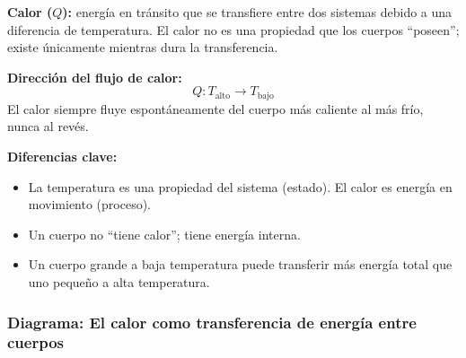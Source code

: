 \begin{seccion}
\begin{definicion}
\textbf{Calor ($Q$):} energía en tránsito que se transfiere entre dos sistemas debido a una diferencia de temperatura. El calor no es una propiedad que los cuerpos ``poseen''; existe únicamente mientras dura la transferencia.
\end{definicion}

\begin{ecuacion}
\textbf{Dirección del flujo de calor:}
$$Q: T_{\text{alto}} \longrightarrow T_{\text{bajo}}$$
El calor siempre fluye espontáneamente del cuerpo más caliente al más frío, nunca al revés.
\end{ecuacion}

\textbf{Diferencias clave:}
\begin{itemize}
    \item La temperatura es una propiedad del sistema (estado). El calor es energía en movimiento (proceso).
    \item Un cuerpo no ``tiene calor''; tiene energía interna.
    \item Un cuerpo grande a baja temperatura puede transferir más energía total que uno pequeño a alta temperatura.
\end{itemize}
\end{seccion}

\subsubsection{Diagrama: El calor como transferencia de energía entre cuerpos}


